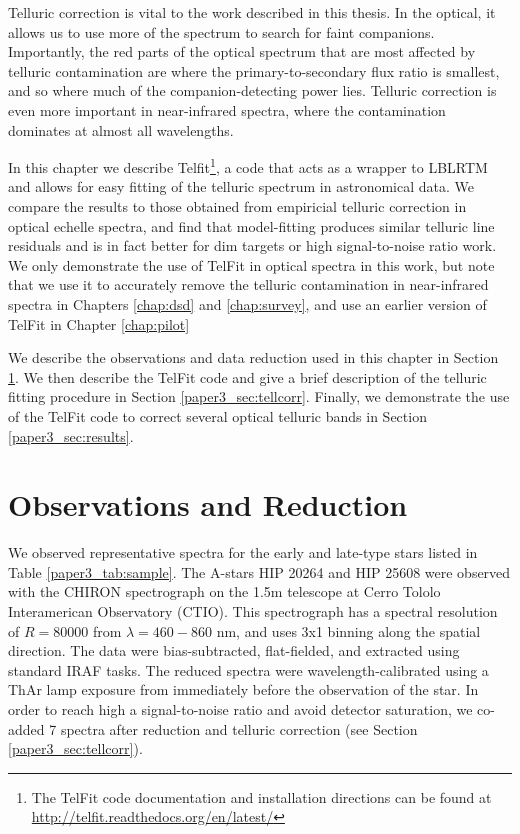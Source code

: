 Telluric correction is vital to the work described in this thesis. In the optical, it allows us to use more of the spectrum to search for faint companions. Importantly, the red parts of the optical spectrum that are most affected by telluric contamination are where the primary-to-secondary flux ratio is smallest, and so where much of the companion-detecting power lies. Telluric correction is even more important in near-infrared spectra, where the contamination dominates at almost all wavelengths.

In this chapter we describe Telfit\footnote{The TelFit code documentation and installation directions can be found at \url{http://telfit.readthedocs.org/en/latest/}}, a code that acts as a wrapper to LBLRTM and allows for easy fitting of the telluric spectrum in astronomical data. We compare the results to those obtained from empiricial telluric correction in optical echelle spectra, and find that model-fitting produces similar telluric line residuals and is in fact better for dim targets or high signal-to-noise ratio work. We only demonstrate the use of TelFit in optical spectra in this work, but note that we use it to accurately remove the telluric contamination in near-infrared spectra in Chapters \ref{chap:dsd} and \ref{chap:survey}, and use an earlier version of TelFit in Chapter \ref{chap:pilot}


We describe the observations and data reduction used in this chapter in Section \ref{paper3_sec:obs}. We then describe the TelFit code and give a brief description of the telluric fitting procedure in Section \ref{paper3_sec:tellcorr}. Finally, we demonstrate the use of the TelFit code to correct several optical telluric bands in Section \ref{paper3_sec:results}. 




\section{Observations and Reduction}
\label{paper3_sec:obs}
We observed representative spectra for the early and late-type stars listed in Table \ref{paper3_tab:sample}. The A-stars HIP 20264 and HIP 25608 were observed with the CHIRON spectrograph on the 1.5m telescope at Cerro Tololo Interamerican Observatory (CTIO). This spectrograph has a spectral resolution of $R = 80000$ from $\lambda = 460 - 860$ nm, and uses 3x1 binning along the spatial direction. The data were bias-subtracted, flat-fielded, and extracted using standard IRAF tasks. The reduced spectra were wavelength-calibrated using a ThAr lamp exposure from immediately before the observation of the star. In order to reach high a signal-to-noise ratio and avoid detector saturation, we co-added 7 spectra after reduction and telluric correction (see Section \ref{paper3_sec:tellcorr}).


